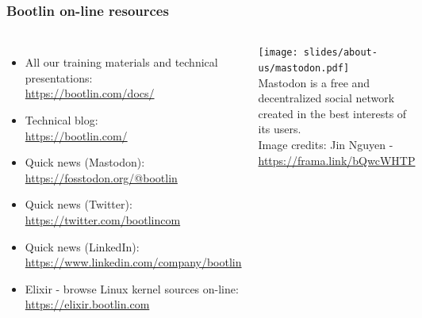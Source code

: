 \begin{frame}
\frametitle{Bootlin on-line resources}
\begin{columns}
  \begin{itemize}
    \item All our training materials and technical presentations:\\
          \url{https://bootlin.com/docs/}
    \item Technical blog:\\
          \url{https://bootlin.com/}
    \item Quick news (Mastodon):\\
          \url{https://fosstodon.org/@bootlin}
    \item Quick news (Twitter):\\
          \url{https://twitter.com/bootlincom}
    \item Quick news (LinkedIn):\\
	  \url{https://www.linkedin.com/company/bootlin}
    \item Elixir - browse Linux kernel sources on-line:\\
          \url{https://elixir.bootlin.com}
  \end{itemize}
  \texttt{[image: slides/about-us/mastodon.pdf]}\\
  \vspace{3cm}
  \small Mastodon is a free and decentralized social network created
  in the best interests of its users.\\
  \vspace{0.5cm}
  \tiny Image credits: Jin Nguyen - \url{https://frama.link/bQwcWHTP}
\end{columns}
\end{frame}

